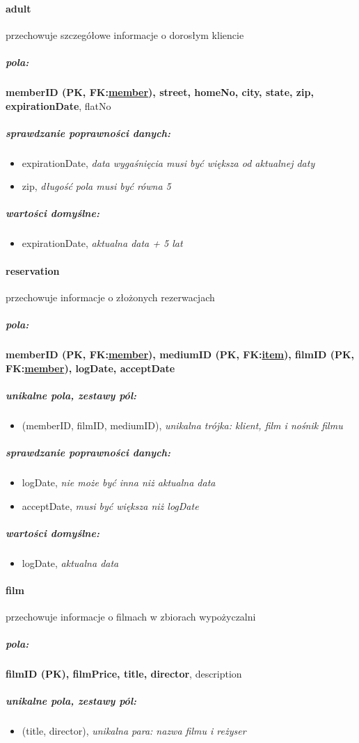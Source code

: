 \documentclass[12pt,a4paper,titlepage]{article}
\begin{document}
\paragraph{adult} przechowuje szczegółowe informacje o dorosłym kliencie
\subparagraph{pola:}
\textbf{memberID (PK, FK:\underline{member}), street, homeNo, city, state, zip, expirationDate}, flatNo
\subparagraph{sprawdzanie poprawności danych:}
\begin{itemize}
	\item expirationDate, \textit{data wygaśnięcia musi być większa od aktualnej daty}
	\item zip, \textit{długość pola musi być równa 5}
\end{itemize}
\subparagraph{wartości domyślne:}
\begin{itemize}
	\item expirationDate, \textit{aktualna data + 5 lat}
\end{itemize}

\paragraph{reservation} przechowuje informacje o złożonych rezerwacjach
\subparagraph{pola:}
\textbf{memberID (PK, FK:\underline{member}), mediumID (PK, FK:\underline{item}), filmID (PK, FK:\underline{member}), logDate, acceptDate}
\subparagraph{unikalne pola, zestawy pól:}
\begin{itemize}
	\item (memberID, filmID, mediumID), \textit{unikalna trójka: klient, film i nośnik filmu}
\end{itemize}
\subparagraph{sprawdzanie poprawności danych:}
\begin{itemize}
	\item logDate, \textit{nie może być inna niż aktualna data}
	\item acceptDate, \textit{musi być większa niż logDate}
\end{itemize}
\subparagraph{wartości domyślne:}
\begin{itemize}
	\item logDate, \textit{aktualna data}
\end{itemize}

\paragraph{film} przechowuje informacje o filmach w zbiorach wypożyczalni
\subparagraph{pola:}
\textbf{filmID (PK), filmPrice, title, director}, description
\subparagraph{unikalne pola, zestawy pól:}
\begin{itemize}
	\item (title, director), \textit{unikalna para: nazwa filmu i reżyser}
\end{itemize}
\end{document}
